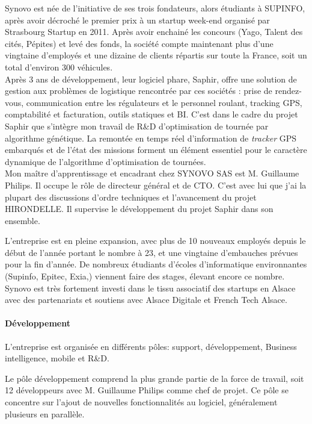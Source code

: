 \documentclass[12pt]{memoir}
\begin{document}
\bigskip
Synovo est née de l'initiative de ses trois fondateurs, alors étudiants
à SUPINFO, après avoir décroché le premier prix à un startup week-end
organisé par Strasbourg Startup en 2011. Après avoir enchainé les
concours (Yago, Talent des cités, Pépites) et levé des fonds, la société
compte maintenant plus d'une vingtaine d'employés et une dizaine de
clients répartis sur toute la France, soit un total d'environ 300
véhicules. \\
Après 3 ans de développement, leur logiciel phare, Saphir, offre une
solution de gestion aux problèmes de logistique rencontrée par ces
sociétés : prise de rendez-vous, communication entre les régulateurs et
le personnel roulant, tracking GPS, comptabilité et facturation, outils
statiques et BI. C'est dans le cadre du projet Saphir que s'intègre mon
travail de R\&D d'optimisation de tournée par algorithme génétique. La
remontée en temps réel d'information de \emph{tracker} GPS embarqués et
de l'état des missions forment un élément essentiel pour le caractère
dynamique de l'algorithme d'optimisation de tournées. \\
Mon maître
d'apprentissage et encadrant chez SYNOVO SAS est M. Guillaume Philips.
Il occupe le rôle de directeur général et de CTO. C'est avec lui que
j'ai la plupart des discussions d'ordre techniques et l'avancement du
projet HIRONDELLE. Il supervise le développement du projet Saphir dans
son ensemble.

\bigskip
L'entreprise est en pleine expansion, avec plus de 10 nouveaux employés
depuis le début de l'année portant le nombre à 23, et une vingtaine
d'embauches prévues pour la fin d'année. De nombreux étudiants d'écoles
d'informatique environnantes (Supinfo, Epitec, Exia,) viennent faire des
stages, élevant encore ce nombre. Synovo est très fortement investi dans
le tissu associatif des startups en Alsace avec des partenariats et
soutiens avec Alsace Digitale et French Tech Alsace.

\paragraph{Développement}\label{duxe9veloppement}

L'entreprise est organisée en différents pôles: support, développement,
Business intelligence, mobile et R\&D.

Le pôle développement comprend la plus grande partie de la force de
travail, soit 12 développeurs avec M. Guillaume Philips comme chef de
projet. Ce pôle se concentre sur l'ajout de nouvelles fonctionnalités au
logiciel, généralement plusieurs en parallèle.
\end{document}
